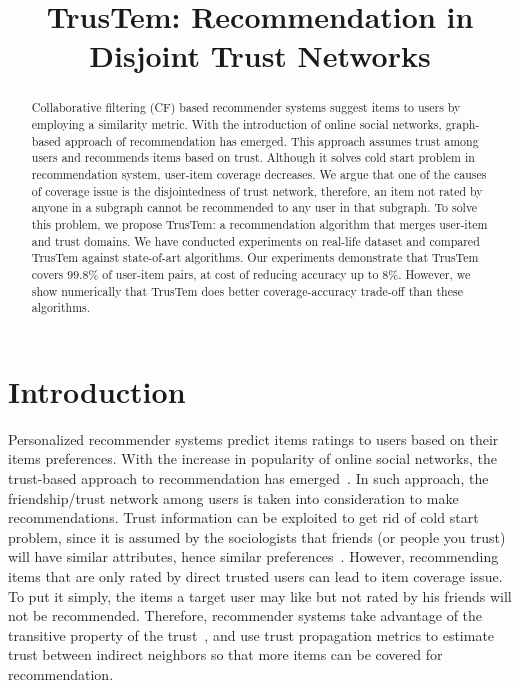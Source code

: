 \documentclass[11pt, conference, onecolumn]{IEEEtran}
\begin{document}
\title{TrusTem: Recommendation in Disjoint Trust Networks}

\author{
\and
{}
}

\maketitle

\begin{abstract}
Collaborative filtering (CF) based recommender systems suggest items to users by employing a similarity metric. With the introduction of online social networks, graph-based approach of recommendation has emerged. This approach assumes trust among users and recommends items based on trust. Although it solves cold start problem in recommendation system, user-item coverage decreases. We argue that one of the causes of coverage issue is the disjointedness of trust network, therefore, an item not rated by anyone in a subgraph cannot be recommended to any user in that subgraph. To solve this problem, we propose TrusTem: a recommendation algorithm that merges user-item and trust domains. We have conducted experiments on real-life dataset and compared TrusTem against state-of-art algorithms. Our experiments demonstrate that TrusTem covers $99.8\%$ of user-item pairs, at cost of reducing accuracy up to $8\%$. However, we show numerically that TrusTem does better coverage-accuracy trade-off than these algorithms.
\end{abstract}

\section{Introduction} \label{sec:intro}
Personalized recommender systems predict items ratings to users based on their items preferences. With the increase in popularity of online social networks, the trust-based approach to recommendation has emerged~\cite{Massa:2007,Golbeck:2005,Jamali:2009,Jamali:2010}. In such approach, the friendship/trust network among users is taken into consideration to make recommendations. Trust information can be exploited to get rid of cold start problem, since it is assumed by the sociologists that friends (or people you trust) will have similar attributes, hence similar preferences~\cite{Friedkin:1998}. However, recommending items that are only rated by direct trusted users can lead to item coverage issue. To put it simply, the items a target user may like but not rated by his friends will not be recommended. Therefore, recommender systems take advantage of the transitive property of the trust~\cite{Andersen:2008}, and use trust propagation metrics to estimate trust between indirect neighbors so that more items can be covered for recommendation. 
\end{document}

